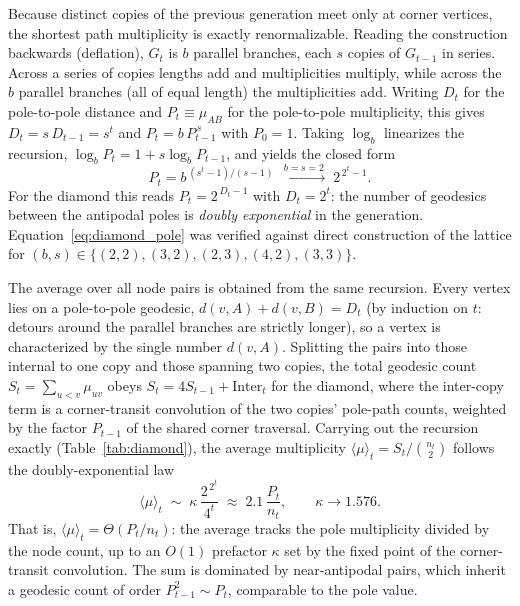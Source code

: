 \documentclass[reprint,aps,pre,amsmath,amssymb,superscriptaddress,showpacs]{revtex4-1}
\begin{document}
Because distinct copies of the previous generation meet only at corner vertices, the shortest path multiplicity is exactly renormalizable. Reading the construction backwards (deflation), $G_t$ is $b$ parallel branches, each $s$ copies of $G_{t-1}$ in series. Across a series of copies lengths add and multiplicities multiply, while across the $b$ parallel branches (all of equal length) the multiplicities add. Writing $D_t$ for the pole-to-pole distance and $P_t\equiv\mu_{AB}$ for the pole-to-pole multiplicity, this gives $D_t=s\,D_{t-1}=s^{t}$ and $P_t=b\,P_{t-1}^{\,s}$ with $P_0=1$. Taking $\log_b$ linearizes the recursion, $\log_b P_t = 1+s\log_b P_{t-1}$, and yields the closed form
%
\begin{equation}
P_t = b^{\,(s^{t}-1)/(s-1)} \;\xrightarrow{\,b=s=2\,}\; 2^{\,2^{t}-1}.
\label{eq:diamond_pole}
\end{equation}
%
For the diamond this reads $P_t=2^{\,D_t-1}$ with $D_t=2^{t}$: the number of geodesics between the antipodal poles is \emph{doubly exponential} in the generation. Equation~\eqref{eq:diamond_pole} was verified against direct construction of the lattice for $(b,s)\in\{(2,2),(3,2),(2,3),(4,2),(3,3)\}$.

The average over all node pairs is obtained from the same recursion. Every vertex lies on a pole-to-pole geodesic, $d(v,A)+d(v,B)=D_t$ (by induction on $t$: detours around the parallel branches are strictly longer), so a vertex is characterized by the single number $d(v,A)$. Splitting the pairs into those internal to one copy and those spanning two copies, the total geodesic count $S_t=\sum_{u<v}\mu_{uv}$ obeys $S_t=4S_{t-1}+\mathrm{Inter}_t$ for the diamond, where the inter-copy term is a corner-transit convolution of the two copies' pole-path counts, weighted by the factor $P_{t-1}$ of the shared corner traversal. Carrying out the recursion exactly (Table~\ref{tab:diamond}), the average multiplicity $\langle\mu\rangle_t=S_t/\binom{n_t}{2}$ follows the doubly-exponential law
%
\begin{equation}
\langle\mu\rangle_t \;\sim\; \kappa\,\frac{2^{\,2^{t}}}{4^{t}} \;\approx\; 2.1\,\frac{P_t}{n_t},
\qquad \kappa\to1.576 .
\label{eq:diamond_avg}
\end{equation}
%
That is, $\langle\mu\rangle_t=\Theta(P_t/n_t)$: the average tracks the pole multiplicity divided by the node count, up to an $O(1)$ prefactor $\kappa$ set by the fixed point of the corner-transit convolution. The sum is dominated by near-antipodal pairs, which inherit a geodesic count of order $P_{t-1}^{2}\sim P_t$, comparable to the pole value.
\end{document}
